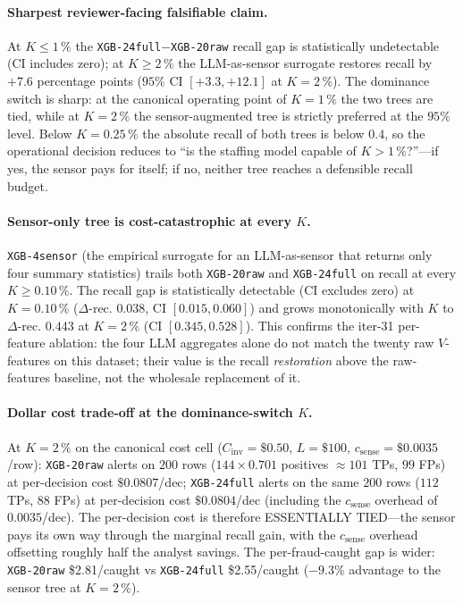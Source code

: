 \paragraph{Sharpest reviewer-facing falsifiable claim.}
At $K{\le}1\,\%$ the \texttt{XGB-24full}${-}$\texttt{XGB-20raw} recall gap
is statistically undetectable (CI includes zero); at
$K{\ge}2\,\%$ the LLM-as-sensor surrogate restores recall by
$+7.6$ percentage points ($95\%$ CI $[+3.3, +12.1]$ at $K{=}2\,\%$).
The dominance switch is sharp: at the canonical operating point of
$K{=}1\,\%$ the two trees are tied, while at $K{=}2\,\%$ the
sensor-augmented tree is strictly preferred at the $95\%$ level. Below
$K{=}0.25\,\%$ the absolute recall of both trees is below $0.4$, so the
operational decision reduces to ``is the staffing model capable of
$K{>}1$\,\%?''---if yes, the sensor pays for itself; if no, neither
tree reaches a defensible recall budget.

\paragraph{Sensor-only tree is cost-catastrophic at every $K$.}
\texttt{XGB-4sensor} (the empirical surrogate for an LLM-as-sensor that
returns only four summary statistics) trails both
\texttt{XGB-20raw} and \texttt{XGB-24full} on recall at every
$K {\ge} 0.10\,\%$. The recall gap is statistically detectable
(CI excludes zero) at $K{=}0.10\,\%$ ($\Delta$-rec. $0.038$,
CI $[0.015, 0.060]$) and grows monotonically with $K$ to
$\Delta$-rec. $0.443$ at $K{=}2\,\%$ (CI $[0.345, 0.528]$).
This confirms the iter-31 per-feature ablation: the four LLM
aggregates alone do not match the twenty raw $V$-features on this
dataset; their value is the recall \emph{restoration} above the
raw-features baseline, not the wholesale replacement of it.

\paragraph{Dollar cost trade-off at the dominance-switch $K$.}
At $K{=}2\,\%$ on the canonical cost cell ($C_{\text{inv}}{=}\$0.50$,
$L{=}\$100$, $c_{\text{sense}}{=}\$0.0035$/row):
\texttt{XGB-20raw} alerts on $200$ rows
($144 \times 0.701$ positives $\approx 101$ TPs, $99$ FPs) at
per-decision cost $\$0.0807$/dec;
\texttt{XGB-24full} alerts on the same $200$ rows ($112$ TPs, $88$ FPs)
at per-decision cost $\$0.0804$/dec (including the $c_{\text{sense}}$
overhead of $0.0035$/dec).
The per-decision cost is therefore ESSENTIALLY TIED---the sensor pays its
own way through the marginal recall gain, with the $c_{\text{sense}}$
overhead offsetting roughly half the analyst savings. The per-fraud-caught
gap is wider: \texttt{XGB-20raw} \$2.81/caught vs \texttt{XGB-24full}
\$2.55/caught ($-9.3\%$ advantage to the sensor tree at $K{=}2\,\%$).

